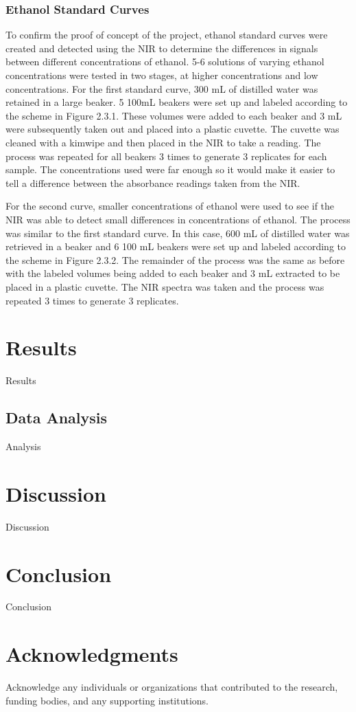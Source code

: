 \documentclass[final, 3p, 11pt]{elsarticle}
\begin{document}
\subsubsection{Ethanol Standard Curves}
To confirm the proof of concept of the project, ethanol standard curves were created and detected using the NIR to determine the differences in signals between different concentrations of ethanol. 5-6 solutions of varying ethanol concentrations were tested in two stages, at higher concentrations and low concentrations. For the first standard curve, 300 mL of distilled water was retained in a large beaker. 5 100mL beakers were set up and labeled according to the scheme in Figure 2.3.1. These volumes were added to each beaker and 3 mL were subsequently taken out and placed into a plastic cuvette. The cuvette was cleaned with a kimwipe and then placed in the NIR to take a reading. The process was repeated for all beakers 3 times to generate 3 replicates for each sample. The concentrations used were far enough so it would make it easier to tell a difference between the absorbance readings taken from the NIR.

For the second curve, smaller concentrations of ethanol were used to see if the NIR was able to detect small differences in concentrations of ethanol. The process was similar to the first standard curve. In this case, 600 mL of distilled water was retrieved in a beaker and 6 100 mL beakers were set up and labeled according to the scheme in Figure 2.3.2. The remainder of the process was the same as before with the labeled volumes being added to each beaker and 3 mL extracted to be placed in a plastic cuvette. The NIR spectra was taken and the process was repeated 3 times to generate 3 replicates. 

\section{Results}
Results

\subsection{Data Analysis}
Analysis

\section{Discussion}
Discussion

\section{Conclusion}
Conclusion

\section*{Acknowledgments}
Acknowledge any individuals or organizations that contributed to the research, funding bodies, and any supporting institutions.

\newpage

\end{document}
